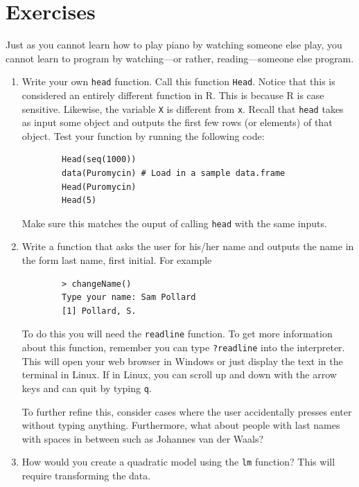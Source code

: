 \documentclass[12pt]{article}
\theoremstyle{remark}
\begin{document}
\newpage
\part{Exercises}

Just as you cannot learn how to play piano by watching someone else play, you cannot learn to program by watching---or rather, reading---someone else program.

\begin{enumerate}
	\item { Write your own \verb|head| function. Call this function \verb|Head|. Notice that this is considered an entirely different function in R. This is because R is case sensitive. Likewise, the variable \verb|X| is different from \verb|x|. Recall that \verb|head| takes as input some object and outputs the first few rows (or elements) of that object. Test your function by running the following code:
	\begin{verbatim}
		Head(seq(1000))
		data(Puromycin) # Load in a sample data.frame
		Head(Puromycin)
		Head(5)
	\end{verbatim}
	Make sure this matches the ouput of calling \verb|head| with the same inputs.
	}
	
	\item { Write a function that asks the user for his/her name and outputs the name in the form last name, first initial. For example
	\begin{verbatim}
		> changeName()
		Type your name: Sam Pollard
		[1] Pollard, S.
	\end{verbatim}
	
	To do this you will need the \verb|readline| function. To get more information about this function, remember you can type \verb|?readline| into the interpreter. This will open your web browser in Windows or just display the text in the terminal in Linux. If in Linux, you can scroll up and down with the arrow keys and can quit by typing \verb|q|.
	
	To further refine this, consider cases where the user accidentally presses enter without typing anything. Furthermore, what about people with last names with spaces in between such as Johannes van der Waals?
	}
	
	\item { How would you create a quadratic model using the \verb|lm| function? This will require transforming the data.
	}

\end{enumerate}
\end{document}
